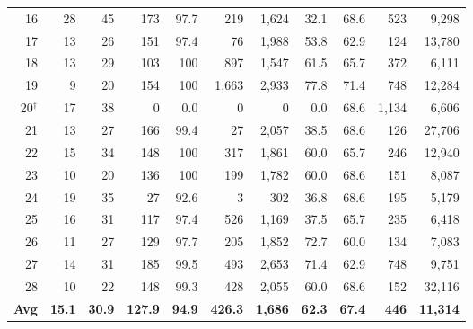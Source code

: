 \begin{table}[t]
\begin{tabular}{r r r r r r r r r r r}
    16 & 28 & 45 & 173 & 97.7 &    219 & 1{,}624 & 32.1 & 68.6 &    523 &  9{,}298 \\
    17 & 13 & 26 & 151 & 97.4 &     76 & 1{,}988 & 53.8 & 62.9 &    124 & 13{,}780 \\
    18 & 13 & 29 & 103 & 100  &    897 & 1{,}547 & 61.5 & 65.7 &    372 &  6{,}111 \\
    19 &  9 & 20 & 154 & 100  &  1{,}663 & 2{,}933 & 77.8 & 71.4 &    748 & 12{,}284 \\
    20$^\dagger$ & 17 & 38 &   0 &  0.0 &      0 &      0 &  0.0 & 68.6 & 1{,}134 &  6{,}606 \\
    21 & 13 & 27 & 166 & 99.4 &     27 & 2{,}057 & 38.5 & 68.6 &    126 & 27{,}706 \\
    22 & 15 & 34 & 148 & 100  &    317 & 1{,}861 & 60.0 & 65.7 &    246 & 12{,}940 \\
    23 & 10 & 20 & 136 & 100  &    199 & 1{,}782 & 60.0 & 68.6 &    151 &  8{,}087 \\
    24 & 19 & 35 &  27 & 92.6 &      3 &    302 & 36.8 & 68.6 &    195 &  5{,}179 \\
    25 & 16 & 31 & 117 & 97.4 &    526 & 1{,}169 & 37.5 & 65.7 &    235 &  6{,}418 \\
    26 & 11 & 27 & 129 & 97.7 &    205 & 1{,}852 & 72.7 & 60.0 &    134 &  7{,}083 \\
    27 & 14 & 31 & 185 & 99.5 &    493 & 2{,}653 & 71.4 & 62.9 &    748 &  9{,}751 \\
    28 & 10 & 22 & 148 & 99.3 &    428 & 2{,}055 & 60.0 & 68.6 &    152 & 32{,}116 \\
    \midrule
    \textbf{Avg} & \textbf{15.1} & \textbf{30.9} & \textbf{127.9} & \textbf{94.9} & \textbf{426.3} & \textbf{1{,}686} & \textbf{62.3} & \textbf{67.4} & \textbf{446} & \textbf{11{,}314} \\
    \bottomrule
  \end{tabular}
\end{table}
